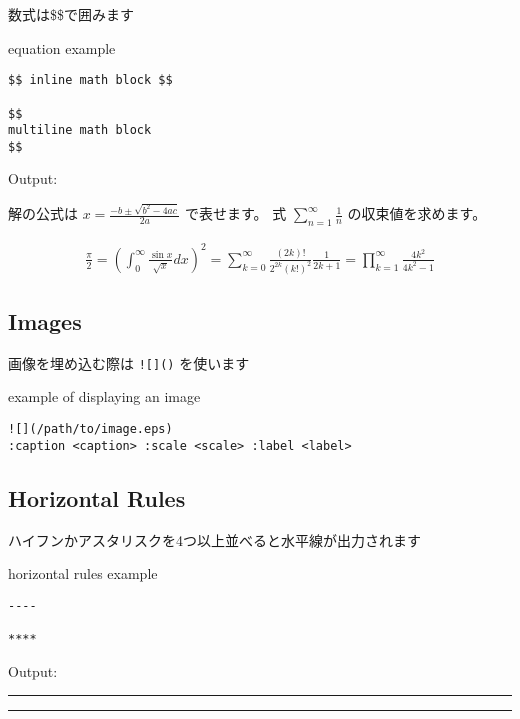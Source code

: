 \documentclass[a4j, titlepage]{jarticle}
\begin{document}
数式は\$\$で囲みます

\begin{itembox}[c]{equation example}
\begin{verbatim}
$$ inline math block $$

$$
multiline math block
$$
\end{verbatim}
\end{itembox}

Output:

解の公式は $ x = \frac{-b\pm\sqrt{b^2-4ac}}{2a} $ で表せます。
式 $ \sum_{n = 1}^{\infty} \frac{1}{n} $ の収束値を求めます。

\begin{eqnarray*}
\frac{\pi}{2}
= \left( \int_{0}^{\infty} \frac{\sin x}{\sqrt{x}} dx \right)^2 
= \sum_{k=0}^{\infty} \frac{(2k)!}{2^{2k}(k!)^2} \frac{1}{2k+1} 
= \prod_{k=1}^{\infty} \frac{4k^2}{4k^2 - 1}
\end{eqnarray*}

\subsection{Images}

画像を埋め込む際は {\tt ![]()} を使います

\begin{itembox}[c]{example of displaying an image}
\begin{verbatim}
![](/path/to/image.eps)
:caption <caption> :scale <scale> :label <label>
\end{verbatim}
\end{itembox}

\subsection{Horizontal Rules}

ハイフンかアスタリスクを4つ以上並べると水平線が出力されます

\begin{itembox}[c]{horizontal rules example}
\begin{verbatim}
----

****
\end{verbatim}
\end{itembox}

Output:

\begin{center}
\rule{3in}{0.4pt}
\end{center}

\begin{center}
\rule{3in}{0.4pt}
\end{center}
\end{document}
